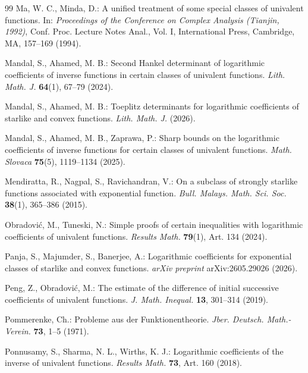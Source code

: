 \documentclass[11pt,reqno]{amsart}
\numberwithin{equation}{section}
\begin{document}
\begin{thebibliography}{99}
Ma, W. C., Minda, D.:
A unified treatment of some special classes of univalent functions.
In: \textit{Proceedings of the Conference on Complex Analysis (Tianjin, 1992)}, Conf. Proc. Lecture Notes Anal., Vol. I, International Press, Cambridge, MA, 157--169 (1994).

Mandal, S., Ahamed, M. B.:
Second Hankel determinant of logarithmic coefficients of inverse functions in certain classes of univalent functions.
\textit{Lith. Math. J.} \textbf{64}(1), 67--79 (2024).

Mandal, S., Ahamed, M. B.:
Toeplitz determinants for logarithmic coefficients of starlike and convex functions.
\textit{Lith. Math. J.} (2026).

Mandal, S., Ahamed, M. B., Zaprawa, P.:
Sharp bounds on the logarithmic coefficients of inverse functions for certain classes of univalent functions.
\textit{Math. Slovaca} \textbf{75}(5), 1119--1134 (2025).

Mendiratta, R., Nagpal, S., Ravichandran, V.:
On a subclass of strongly starlike functions associated with exponential function.
\textit{Bull. Malays. Math. Sci. Soc.} \textbf{38}(1), 365--386 (2015).

Obradovi\'c, M., Tuneski, N.:
Simple proofs of certain inequalities with logarithmic coefficients of univalent functions.
\textit{Results Math.} \textbf{79}(1), Art. 134 (2024).

Panja, S., Majumder, S., Banerjee, A.:
Logarithmic coefficients for exponential classes of starlike and convex functions.
\textit{arXiv preprint} arXiv:2605.29026 (2026).

Peng, Z., Obradovi\'c, M.:
The estimate of the difference of initial successive coefficients of univalent functions.
\textit{J. Math. Inequal.} \textbf{13}, 301--314 (2019).

Pommerenke, Ch.:
Probleme aus der Funktionentheorie.
\textit{Jber. Deutsch. Math.-Verein.} \textbf{73}, 1--5 (1971).

Ponnusamy, S., Sharma, N. L., Wirths, K. J.:
Logarithmic coefficients of the inverse of univalent functions.
\textit{Results Math.} \textbf{73}, Art. 160 (2018).


\end{thebibliography}
\end{document}
